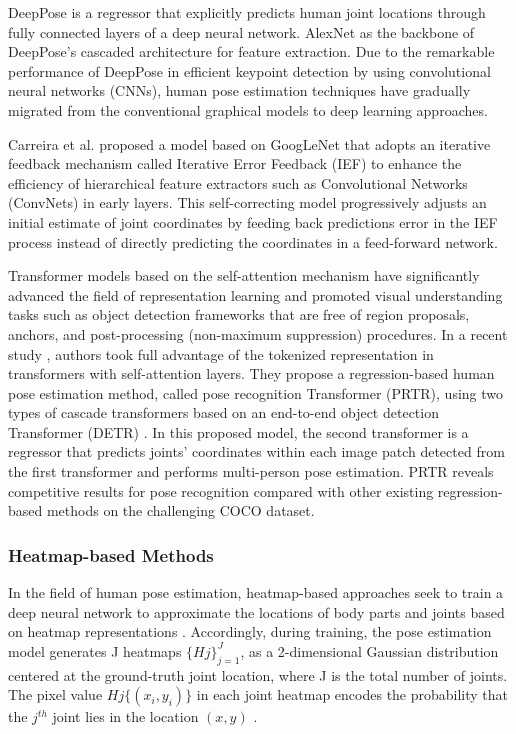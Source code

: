 DeepPose \cite{toshev_deeppose_2014} is a regressor that explicitly predicts human joint locations through fully connected layers of a deep neural network. AlexNet \cite{krizhevsky_imagenet_2012} as the backbone of DeepPose's cascaded architecture for feature extraction. Due to the remarkable performance of DeepPose in efficient keypoint detection by using convolutional neural networks (CNNs), human pose estimation techniques have gradually migrated from the conventional graphical models to deep learning approaches. 

Carreira et al. \cite{carreira_human_2016} proposed a model based on GoogLeNet \cite{szegedy_going_2014} that adopts an iterative feedback mechanism called Iterative Error Feedback (IEF) to enhance the efficiency of hierarchical feature extractors such as Convolutional Networks (ConvNets) in early layers. This self-correcting model progressively adjusts an initial estimate of joint coordinates by feeding back predictions error in the IEF process instead of directly predicting the coordinates in a feed-forward network.

Transformer models \cite{vaswani_attention_2017} based on the self-attention mechanism have significantly advanced the field of representation learning and promoted visual understanding tasks such as object detection frameworks that are free of region proposals, anchors, and post-processing (non-maximum suppression) procedures. In a recent study \cite{li_pose_2021}, authors took full advantage of the tokenized representation in transformers with self-attention layers. They propose a regression-based human pose estimation method, called pose recognition Transformer (PRTR), using two types of cascade transformers based on an end-to-end object detection Transformer (DETR) \cite{carion_end--end_2020}. In this proposed model, the second transformer is a regressor that predicts joints' coordinates within each image patch detected from the first transformer and performs multi-person pose estimation. PRTR reveals competitive results for pose recognition compared with other existing regression-based methods on the challenging COCO dataset.


\subsubsection{Heatmap-based Methods}

In the field of human pose estimation, heatmap-based approaches seek to train a deep neural network to approximate the locations of body parts and joints based on heatmap representations \cite{chen_articulated_2014, newell_stacked_2016, wei_convolutional_2016}. Accordingly, during training, the pose estimation model generates J heatmaps $\{Hj\}_{j=1}^J$, as a 2-dimensional Gaussian distribution centered at the ground-truth joint location, where J is the total number of joints. The pixel value $Hj \{(x_i,y_i)\}$ in each joint heatmap encodes the probability that the $j^{th}$ joint lies in the location $(x,y)$  \cite{tompson_efficient_2015, tompson_joint_2014}. 

